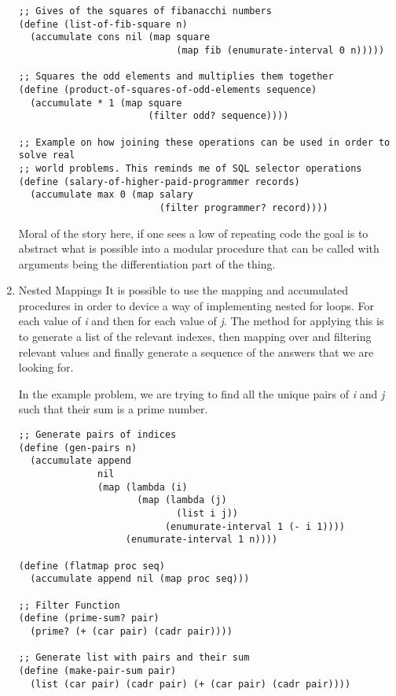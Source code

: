 \documentclass[11pt]{article}
\begin{document}
\begin{enumerate}
\begin{verbatim}
;; Gives of the squares of fibanacchi numbers
(define (list-of-fib-square n)
  (accumulate cons nil (map square
                            (map fib (enumurate-interval 0 n)))))

;; Squares the odd elements and multiplies them together
(define (product-of-squares-of-odd-elements sequence)
  (accumulate * 1 (map square
                       (filter odd? sequence))))

;; Example on how joining these operations can be used in order to solve real
;; world problems. This reminds me of SQL selector operations
(define (salary-of-higher-paid-programmer records)
  (accumulate max 0 (map salary
                         (filter programmer? record))))
\end{verbatim}

Moral of the story here, if one sees a low of repeating code the goal is
to abstract what is possible into a modular procedure that can be called
with arguments being the differentiation part of the thing.

\item Nested Mappings
\label{sec:orgd20bfad}
It is possible to use the mapping and accumulated procedures in order to
device a way of implementing nested for loops. For each value of \emph{i} and
then for each value of \emph{j}. The method for applying this is to generate
a list of the relevant indexes, then mapping over and filtering relevant
values and finally generate a sequence of the answers that we are
looking for.

In the example problem, we are trying to find all the unique pairs of
\emph{i} and \emph{j} such that their sum is a prime number.

\begin{verbatim}
;; Generate pairs of indices
(define (gen-pairs n)
  (accumulate append
              nil
              (map (lambda (i)
                     (map (lambda (j)
                            (list i j))
                          (enumurate-interval 1 (- i 1))))
                   (enumurate-interval 1 n))))

(define (flatmap proc seq)
  (accumulate append nil (map proc seq)))

;; Filter Function
(define (prime-sum? pair)
  (prime? (+ (car pair) (cadr pair))))

;; Generate list with pairs and their sum
(define (make-pair-sum pair)
  (list (car pair) (cadr pair) (+ (car pair) (cadr pair))))


\end{verbatim}
\end{enumerate}
\end{document}
